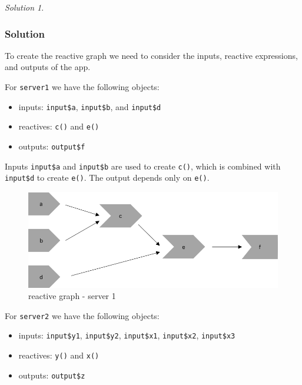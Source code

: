 \documentclass[
]{book}
\providecommand{\tightlist}{%
  \setlength{\itemsep}{0pt}\setlength{\parskip}{0pt}}
\theoremstyle{definition}
\theoremstyle{definition}
\theoremstyle{definition}
\theoremstyle{definition}
\theoremstyle{remark}
\newtheorem*{solution}{Solution}
\begin{document}
\begin{solution}
\leavevmode

\hypertarget{solution-15}{%
\subsubsection*{Solution}\label{solution-15}}

To create the reactive graph we need to consider the inputs, reactive
expressions, and outputs of the app.

For \texttt{server1} we have the following objects:

\begin{itemize}
\tightlist
\item
  inputs: \texttt{input\$a}, \texttt{input\$b}, and \texttt{input\$d}
\item
  reactives: \texttt{c()} and \texttt{e()}
\item
  outputs: \texttt{output\$f}
\end{itemize}

Inputs \texttt{input\$a} and \texttt{input\$b} are used to create \texttt{c()}, which is combined with
\texttt{input\$d} to create \texttt{e()}. The output depends only on \texttt{e()}.

\begin{figure}
\centering
\includegraphics[width=5.20833in,height=\textheight]{images/4.3.6.1-s1.png}
\caption{reactive graph - server 1}
\end{figure}

For \texttt{server2} we have the following objects:

\begin{itemize}
\tightlist
\item
  inputs: \texttt{input\$y1}, \texttt{input\$y2}, \texttt{input\$x1}, \texttt{input\$x2}, \texttt{input\$x3}
\item
  reactives: \texttt{y()} and \texttt{x()}
\item
  outputs: \texttt{output\$z}
\end{itemize}


\end{solution}
\end{document}
